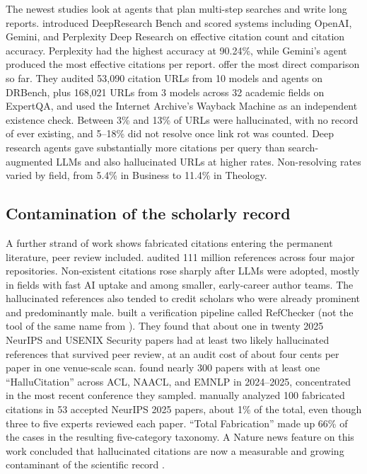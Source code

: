 \documentclass[acmsmall,screen]{acmart}
\begin{document}
The newest studies look at agents that plan multi-step searches and write long reports. \citet{du2025} introduced DeepResearch Bench and scored systems including OpenAI, Gemini, and Perplexity Deep Research on effective citation count and citation accuracy. Perplexity had the highest accuracy at 90.24\%, while Gemini's agent produced the most effective citations per report. \citet{rao2026} offer the most direct comparison so far. They audited 53,090 citation URLs from 10 models and agents on DRBench, plus 168,021 URLs from 3 models across 32 academic fields on ExpertQA, and used the Internet Archive's Wayback Machine as an independent existence check. Between 3\% and 13\% of URLs were hallucinated, with no record of ever existing, and 5--18\% did not resolve once link rot was counted. Deep research agents gave substantially more citations per query than search-augmented LLMs and also hallucinated URLs at higher rates. Non-resolving rates varied by field, from 5.4\% in Business to 11.4\% in Theology.

\subsection{Contamination of the scholarly record}
A further strand of work shows fabricated citations entering the permanent literature, peer review included. \citet{zhao2026} audited 111 million references across four major repositories. Non-existent citations rose sharply after LLMs were adopted, mostly in fields with fast AI uptake and among smaller, early-career author teams. The hallucinated references also tended to credit scholars who were already prominent and predominantly male. \citet{russinovich2026b} built a verification pipeline called RefChecker (not the tool of the same name from \citet{hu2024}). They found that about one in twenty 2025 NeurIPS and USENIX Security papers had at least two likely hallucinated references that survived peer review, at an audit cost of about four cents per paper in one venue-scale scan. \citet{sakai2026} found nearly 300 papers with at least one ``HalluCitation'' across ACL, NAACL, and EMNLP in 2024--2025, concentrated in the most recent conference they sampled. \citet{ansari2026} manually analyzed 100 fabricated citations in 53 accepted NeurIPS 2025 papers, about 1\% of the total, even though three to five experts reviewed each paper. ``Total Fabrication'' made up 66\% of the cases in the resulting five-category taxonomy. A Nature news feature on this work concluded that hallucinated citations are now a measurable and growing contaminant of the scientific record \citep{naddaf2026}.
\end{document}
